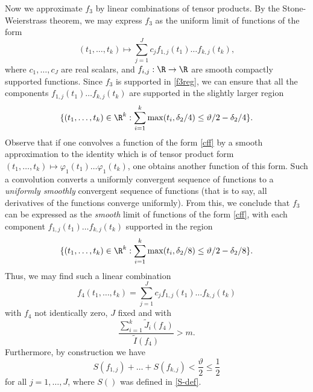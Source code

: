 Now we approximate $f_3$ by linear combinations of tensor products.  By the Stone-Weierstrass theorem, we may express $f_3$ as the uniform limit of functions
of the form
\begin{equation}\label{cff}
 (t_1,\dots,t_k) \mapsto \sum_{j=1}^J c_j f_{1,j}(t_1) \dots f_{k,j}(t_k),
\end{equation}
where $c_1,\dots,c_J$ are real scalars, and $f_{i,j}: \R \to \R$ are smooth compactly supported functions.  Since $f_3$ is supported in \eqref{f3reg}, we can ensure that all the components $f_{1,j}(t_1) \dots f_{k,j}(t_k)$ are supported in the slightly larger region
$$ \{ (t_1,\dots,t_k) \in \R^k: \sum_{i=1}^k \max(t_i, \delta_2/4) \leq \vartheta/2 - \delta_2/4 \}.$$
Observe that if one convolves a function of the form \eqref{cff} by a smooth approximation to the identity which is of tensor product form $(t_1,\dots,t_k) \mapsto \varphi_1(t_1) \dots \varphi_1(t_k)$, one obtains another function of this form.  Such a convolution converts a uniformly convergent sequence of functions to a \emph{uniformly smoothly} convergent sequence of functions (that is to say, all derivatives of the functions converge uniformly).  From this, we conclude that $f_3$ can be expressed as the \emph{smooth} limit of functions of the form \eqref{cff}, with each component $f_{1,j}(t_1) \dots f_{k,j}(t_k)$ supported in the region
$$ \{ (t_1,\dots,t_k) \in \R^k: \sum_{i=1}^k \max(t_i, \delta_2/8) \leq \vartheta/2 - \delta_2/8 \}.$$
Thus, we may find such a linear combination
\begin{equation}\label{f4}
 f_4(t_1,\dots,t_k) = \sum_{j=1}^J c_j f_{1,j}(t_1) \dots f_{k,j}(t_k)
\end{equation}
with $f_4$ not identically zero, $J$ fixed and with
\begin{equation}\label{jbig-6}
 \frac{\sum_{i=1}^k \tilde J_i(f_4)}{\tilde I(f_4)} > m.
\end{equation}
Furthermore, by construction we have
\begin{equation}\label{sfg}
S(f_{1,j}) + \dots + S(f_{k,j}) < \frac{\vartheta}{2} \leq \frac{1}{2}
\end{equation}
for all $j=1,\dots,J$, where $S()$ was defined in \eqref{S-def}.

